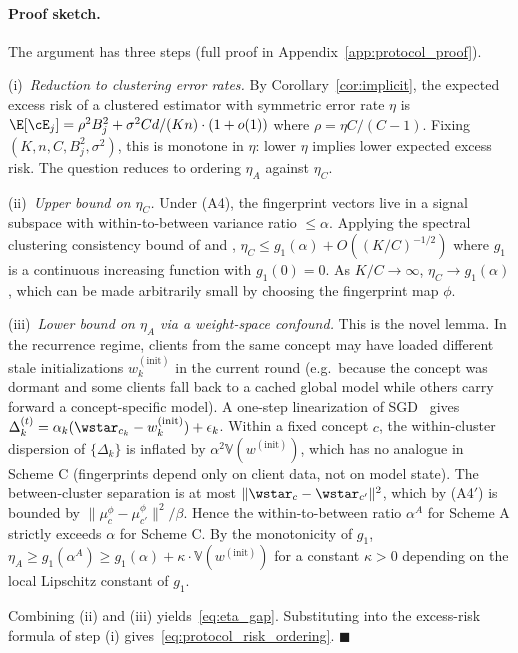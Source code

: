 \paragraph{Proof sketch.}
The argument has three steps (full proof in Appendix~\ref{app:protocol_proof}).

(i)~\emph{Reduction to clustering error rates.} By Corollary~\ref{cor:implicit}, the expected excess risk of a clustered estimator with symmetric error rate $\eta$ is
$\E[\cE_j] = \rho^2 B_j^2 + \sigma^2 C d/(Kn)\cdot(1 + o(1))$ where $\rho = \eta C/(C{-}1)$.
Fixing $(K, n, C, B_j^2, \sigma^2)$, this is monotone in $\eta$: lower $\eta$ implies lower expected excess risk. The question reduces to ordering $\eta_A$ against $\eta_C$.

(ii)~\emph{Upper bound on $\eta_C$.} Under (A4), the fingerprint vectors live in a signal subspace with within-to-between variance ratio $\le \alpha$. Applying the spectral clustering consistency bound of \citet{lei2015consistency} and \citet{loffler2021optimality},
$\eta_C \le g_1(\alpha) + O((K/C)^{-1/2})$
where $g_1$ is a continuous increasing function with $g_1(0) = 0$. As $K/C \to \infty$, $\eta_C \to g_1(\alpha)$, which can be made arbitrarily small by choosing the fingerprint map $\phi$.

(iii)~\emph{Lower bound on $\eta_A$ via a weight-space confound.} This is the novel lemma. In the recurrence regime, clients from the same concept may have loaded different stale initializations $w_k^{(\mathrm{init})}$ in the current round (e.g.\ because the concept was dormant and some clients fall back to a cached global model while others carry forward a concept-specific model). A one-step linearization of SGD~\citep{mania2016perturbed} gives
$\Delta_k^{(t)} = \alpha_k(\wstar_{c_k} - w_k^{(\mathrm{init})}) + \epsilon_k$.
Within a fixed concept $c$, the within-cluster dispersion of $\{\Delta_k\}$ is inflated by $\alpha^2 \mathbb{V}(w^{(\mathrm{init})})$, which has no analogue in Scheme C (fingerprints depend only on client data, not on model state). The between-cluster separation is at most $\|\wstar_c - \wstar_{c'}\|^2$, which by (A4$'$) is bounded by $\|\mu_c^\phi - \mu_{c'}^\phi\|^2 / \beta$. Hence the within-to-between ratio $\alpha^A$ for Scheme A strictly exceeds $\alpha$ for Scheme C. By the monotonicity of $g_1$,
$\eta_A \ge g_1(\alpha^A) \ge g_1(\alpha) + \kappa \cdot \mathbb{V}(w^{(\mathrm{init})})$
for a constant $\kappa > 0$ depending on the local Lipschitz constant of $g_1$.

Combining (ii) and (iii) yields~\eqref{eq:eta_gap}. Substituting into the excess-risk formula of step (i) gives~\eqref{eq:protocol_risk_ordering}. $\blacksquare$

